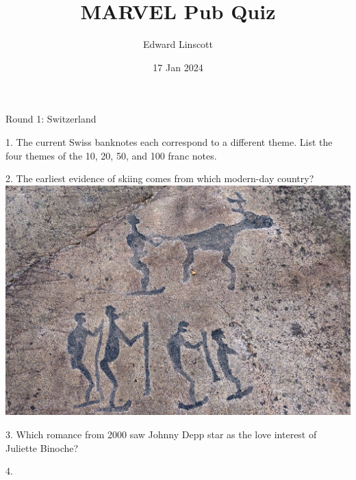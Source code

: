 
\title{MARVEL Pub Quiz}
\author{Edward Linscott}
\date{17 Jan 2024}

\frame{\titlepage}

\begin{frame}
\begin{center}
\Huge
Round 1: Switzerland
\end{center}
\end{frame}
\begin{frame}
\begin{center}
\Large
1. The current Swiss banknotes each correspond to a different theme. List the four themes of the 10, 20, 50, and 100 franc notes.
\end{center}
\end{frame}
\begin{frame}
\begin{center}
\Large
2. The earliest evidence of skiing comes from which modern-day country?
\\
\vspace{0.5em}\includegraphics[height=0.6\paperheight]{images/skiing.jpg}
\end{center}
\end{frame}
\begin{frame}
\begin{center}
\Large
3. Which romance from 2000 saw Johnny Depp star as the love interest of Juliette Binoche?
\end{center}
\end{frame}
\begin{frame}
\begin{center}
\Large
4. 
\end{center}
\end{frame}
